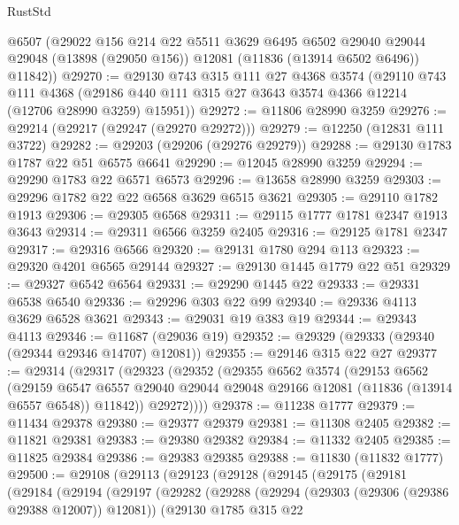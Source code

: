 \begin{lexlean}{RustStd}
\begin{coremodule}
      @6507
      (@29022
        @156
        @214
        @22
        @5511
        @3629
        @6495
        @6502
        @29040
        @29044
        @29048
        (@13898 (@29050 @156))
        @12081
        (@11836 (@13914 @6502 @6496))
        @11842))
@29270 := @29130
    @743
    @315
    @111
    @27
    @4368
    @3574
    (@29110
      @743
      @111
      @4368
      (@29186 @440 @111 @315 @27 @3643 @3574 @4366 @12214 (@12706 @28990 @3259) @15951))
@29272 := @11806 @28990 @3259
@29276 := @29214 (@29217 (@29247 (@29270 @29272)))
@29279 := @12250 (@12831 @111 @3722)
@29282 := @29203 (@29206 (@29276 @29279))
@29288 := @29130 @1783 @1787 @22 @51 @6575 @6641
@29290 := @12045 @28990 @3259
@29294 := @29290 @1783 @22 @6571 @6573
@29296 := @13658 @28990 @3259
@29303 := @29296 @1782 @22 @22 @6568 @3629 @6515 @3621
@29305 := @29110 @1782 @1913
@29306 := @29305 @6568
@29311 := @29115 @1777 @1781 @2347 @1913 @3643
@29314 := @29311 @6566 @3259 @2405
@29316 := @29125 @1781 @2347
@29317 := @29316 @6566
@29320 := @29131 @1780 @294 @113
@29323 := @29320 @4201 @6565 @29144
@29327 := @29130 @1445 @1779 @22 @51
@29329 := @29327 @6542 @6564
@29331 := @29290 @1445 @22
@29333 := @29331 @6538 @6540
@29336 := @29296 @303 @22 @99
@29340 := @29336 @4113 @3629 @6528 @3621
@29343 := @29031 @19 @383 @19
@29344 := @29343 @4113
@29346 := @11687 (@29036 @19)
@29352 := @29329 (@29333 (@29340 (@29344 @29346 @14707) @12081))
@29355 := @29146 @315 @22 @27
@29377 := @29314
    (@29317
      (@29323
        (@29352
          (@29355
            @6562
            @3574
            (@29153
              @6562
              (@29159
                @6547
                @6557
                @29040
                @29044
                @29048
                @29166
                @12081
                (@11836 (@13914 @6557 @6548))
                @11842))
            @29272))))
@29378 := @11238 @1777
@29379 := @11434 @29378
@29380 := @29377 @29379
@29381 := @11308 @2405
@29382 := @11821 @29381
@29383 := @29380 @29382
@29384 := @11332 @2405
@29385 := @11825 @29384
@29386 := @29383 @29385
@29388 := @11830 (@11832 @1777)
@29500 := @29108
    (@29113
      (@29123
        (@29128
          (@29145
            (@29175
              (@29181
                (@29184
                  (@29194
                    (@29197
                      (@29282
                        (@29288
                          (@29294 (@29303 (@29306 (@29386 @29388 @12007)) @12081))
                          (@29130
                            @1785
                            @315
                            @22

\end{coremodule}
\end{lexlean}
